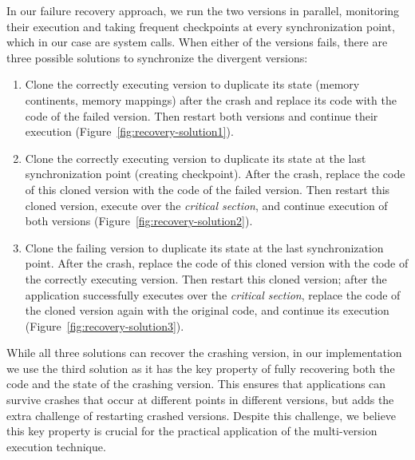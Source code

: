 In our failure recovery approach, we run the two versions in parallel,
monitoring their execution and taking frequent checkpoints at every
synchronization point, which in our case are system calls. When either of the
versions fails, there are three possible solutions to synchronize the divergent
versions:%
\begin{enumerate}
\item\label{s1} Clone the correctly executing version to duplicate its state
  (\eg memory continents, memory mappings) after the crash and replace its
  code with the code of the failed version. Then restart both versions and
  continue their execution (Figure~\ref{fig:recovery-solution1}).
\item\label{s2} Clone the correctly executing version to duplicate its state at
  the last synchronization point (\ie creating checkpoint). After the crash,
  replace the code of this cloned version with the code of the failed version.
  Then restart this cloned version, execute over the \emph{critical section},
  and continue execution of both versions
  (Figure~\ref{fig:recovery-solution2}).
\item\label{s3} Clone the failing version to duplicate its state at the last
  synchronization point. After the crash, replace the code of this cloned
  version with the code of the correctly executing version. Then restart this
  cloned version; after the application successfully executes over the
  \emph{critical section}, replace the code of the cloned version again with
  the original code, and continue its execution
  (Figure~\ref{fig:recovery-solution3}).
\end{enumerate}

While all three solutions can recover the crashing version, in our
implementation we use the third solution as it has the key property of fully
recovering both the code and the state of the crashing version.  This ensures
that applications can survive crashes that occur at different points in
different versions, but adds the extra challenge of restarting crashed
versions. Despite this challenge, we believe this key property is crucial for
the practical application of the multi-version execution technique.


